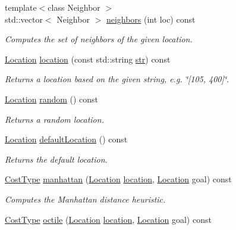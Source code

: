 \begin{DoxyCompactItemize}
{\footnotesize template$<$class Neighbor $>$ }\\std\+::vector$<$ Neighbor $>$ \hyperlink{structGridMap_a26169ca21ebee586976d1e17d803357e}{neighbors} (int loc) const 
\begin{DoxyCompactList}\small\item\em Computes the set of neighbors of the given location. \end{DoxyCompactList}\item 
\hyperlink{structGridMap_ad3b51a1e56e84f0548a80ed647ea359c}{Location} \hyperlink{structGridMap_ac850f77d6878eb0114d16d2766295ba9}{location} (const std\+::string \hyperlink{stream_8h_abd521cb1f3daa92e2c4348f64c0b0b26}{str}) const 
\begin{DoxyCompactList}\small\item\em Returns a location based on the given string, e.\+g. \char`\"{}\mbox{[}105, 400\mbox{]}\char`\"{}. \end{DoxyCompactList}\item 
\hyperlink{structGridMap_ad3b51a1e56e84f0548a80ed647ea359c}{Location} \hyperlink{structGridMap_a09865064f7e5c154fd319d120eca5651}{random} () const 
\begin{DoxyCompactList}\small\item\em Returns a random location. \end{DoxyCompactList}\item 
\hyperlink{structGridMap_ad3b51a1e56e84f0548a80ed647ea359c}{Location} \hyperlink{structGridMap_afb46a884ac7c3fbfa731acecbb8a7afc}{default\+Location} () const 
\begin{DoxyCompactList}\small\item\em Returns the default location. \end{DoxyCompactList}\item 
\hyperlink{structGridMap_a5ed73d957b225bb6d3e4a1b2c27902c8}{Cost\+Type} \hyperlink{structGridMap_a16f099fd22bbf4c071f5dfa4934d2606}{manhattan} (\hyperlink{structGridMap_ad3b51a1e56e84f0548a80ed647ea359c}{Location} \hyperlink{structGridMap_ae4ee97945ca450cf548848105c404584}{location}, \hyperlink{structGridMap_ad3b51a1e56e84f0548a80ed647ea359c}{Location} goal) const 
\begin{DoxyCompactList}\small\item\em Computes the Manhattan distance heuristic. \end{DoxyCompactList}\item 
\hyperlink{structGridMap_a5ed73d957b225bb6d3e4a1b2c27902c8}{Cost\+Type} \hyperlink{structGridMap_a1d0be617fe32c3d9400e389dbd5b6eac}{octile} (\hyperlink{structGridMap_ad3b51a1e56e84f0548a80ed647ea359c}{Location} \hyperlink{structGridMap_ae4ee97945ca450cf548848105c404584}{location}, \hyperlink{structGridMap_ad3b51a1e56e84f0548a80ed647ea359c}{Location} goal) const 

\end{DoxyCompactItemize}
